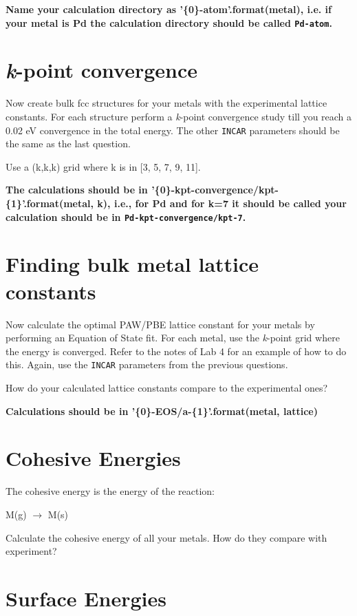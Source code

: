 \documentclass[11pt]{article}
\begin{document}
\textbf{Name your calculation directory as '\{0\}-atom'.format(metal), i.e. if your metal is Pd the calculation directory should be called \texttt{Pd-atom}.}

\section{\emph{k}-point convergence}
\label{sec-2}

Now create bulk fcc structures for your metals with the experimental lattice constants. For each structure perform a \emph{k}-point convergence study till you reach a 0.02 eV convergence in the total energy. The other \texttt{INCAR} parameters should be the same as the last question.

Use a (k,k,k) grid where k is in [3, 5, 7, 9, 11].

\textbf{The calculations should be in '\{0\}-kpt-convergence/kpt-\{1\}'.format(metal, k), i.e., for Pd and for k=7 it should be called your calculation should be in \texttt{Pd-kpt-convergence/kpt-7}.} 

\section{Finding bulk metal lattice constants}
\label{sec-3}

Now calculate the optimal PAW/PBE lattice constant for your metals by performing an Equation of State fit. For each metal, use the \emph{k}-point grid where the energy is converged. Refer to the notes of Lab 4 for an example of how to do this. Again, use the \texttt{INCAR} parameters from the previous questions. 

How do your calculated lattice constants compare to the experimental ones?

\textbf{Calculations should be in '\{0\}-EOS/a-\{1\}'.format(metal, lattice)}

\section{Cohesive Energies}
\label{sec-4}

The cohesive energy is the energy of the reaction:

M(g) $\rightarrow$ M(s)

Calculate the cohesive energy of all your metals. How do they compare with experiment?



\section{Surface Energies}
\label{sec-5}
\end{document}
